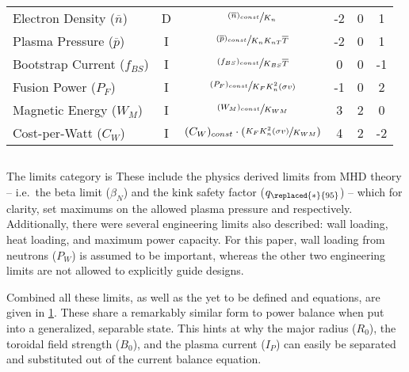 \begin{table}[hb!]
\begin{spacing}{1.5}
\begin{tabular}{lccccc}
Electron Density ($\overline n$) & D & $\sfrac{ (\overline n)_{const} }{ K_n }$ & -2 & 0 & 1 \\
Plasma Pressure ($\overline p$) & I & $\sfrac{ (\overline p)_{const} }{ K_n K_{nT} \overline T }$ & -2 & 0 & 1
\\
Bootstrap Current ($f_{BS}$) & I & $\sfrac{ ( f_{BS} )_{const} }{ K_{BS} \overline T }$ & 0 & 0 & -1 \\
Fusion Power ($P_F$) & I & $\sfrac{ (P_F)_{const} }{ K_F K_n ^ 2 ( \sigma v ) }$ & -1 & 0 & 2 \\
Magnetic Energy ($W_M$) & I & $\sfrac{ (W_M)_{const} }{ K_{WM} }$ & 3 & 2 & 0 \\
Cost-per-Watt ($C_W$) & I & $ (C_W)_{const} \cdot \left( \sfrac{ K_F K_n ^ 2 ( \sigma v ) }{ K_{WM} } \right)$ & 4 & 2 & -2 \\
\end{tabular}
\end{spacing}
\label{table:eq}
\end{table}

\subsection{}

The limits category is  These include the physics derived limits from MHD theory -- i.e.\ the beta limit ($\beta_N$) and the kink safety factor ($q_{\replaced{*}{95}}$) -- which for clarity, set maximums on the allowed plasma pressure and  respectively. Additionally, there were several engineering limits also described: wall loading, heat loading, and maximum power capacity. For this paper, wall loading from neutrons ($P_W$) is assumed to be important, whereas the other two engineering limits are not allowed to explicitly guide designs.

Combined all these limits, as well as the yet to be defined  and  equations, are given in \cref{table:eq}. These share a remarkably similar form to power balance when put into a generalized, separable state. This hints at why the major radius ($R_0$), the toroidal field strength ($B_0$), and the plasma current ($I_P$) can easily be separated and substituted out of the current balance equation.

